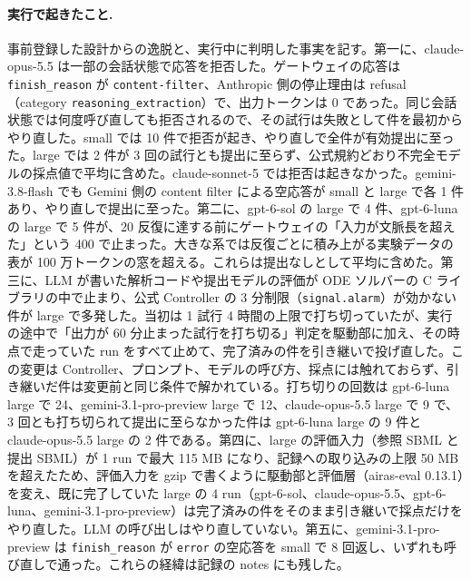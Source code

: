 \documentclass{article}
\providecommand{\unverified}[1]{#1}
\begin{document}


\paragraph{実行で起きたこと.}
事前登録した設計からの逸脱と、実行中に判明した事実を記す。第一に、claude-opus-5.5 は一部の会話状態で応答を拒否した。ゲートウェイの応答は \texttt{finish\_reason} が \texttt{content-filter}、Anthropic 側の停止理由は refusal（category \texttt{reasoning\_extraction}）で、出力トークンは 0 であった。同じ会話状態では何度呼び直しても拒否されるので、その試行は失敗として件を最初からやり直した。small では \unverified{10} 件で拒否が起き、やり直しで全件が有効提出に至った。large では \unverified{2} 件が 3 回の試行とも提出に至らず、公式規約どおり不完全モデルの採点値で平均に含めた。claude-sonnet-5 では拒否は起きなかった。gemini-3.8-flash でも Gemini 側の content filter による空応答が small と large で各 1 件あり、やり直しで提出に至った。第二に、gpt-6-sol の large で 4 件、gpt-6-luna の large で 5 件が、20 反復に達する前にゲートウェイの「入力が文脈長を超えた」という 400 で止まった。大きな系では反復ごとに積み上がる実験データの表が 100 万トークンの窓を超える。これらは提出なしとして平均に含めた。第三に、LLM が書いた解析コードや提出モデルの評価が ODE ソルバーの C ライブラリの中で止まり、公式 Controller の 3 分制限（\texttt{signal.alarm}）が効かない件が large で多発した。当初は 1 試行 4 時間の上限で打ち切っていたが、実行の途中で「出力が 60 分止まった試行を打ち切る」判定を駆動部に加え、その時点で走っていた run をすべて止めて、完了済みの件を引き継いで投げ直した。この変更は Controller、プロンプト、モデルの呼び方、採点には触れておらず、引き継いだ件は変更前と同じ条件で解かれている。打ち切りの回数は gpt-6-luna large で \unverified{24}、gemini-3.1-pro-preview large で \unverified{12}、claude-opus-5.5 large で \unverified{9} で、3 回とも打ち切られて提出に至らなかった件は gpt-6-luna large の \unverified{9} 件と claude-opus-5.5 large の \unverified{2} 件である。第四に、large の評価入力（参照 SBML と提出 SBML）が 1 run で最大 115 MB になり、記録への取り込みの上限 50 MB を超えたため、評価入力を gzip で書くように駆動部と評価層（airas-eval 0.13.1）を変え、既に完了していた large の 4 run（gpt-6-sol、claude-opus-5.5、gpt-6-luna、gemini-3.1-pro-preview）は完了済みの件をそのまま引き継いで採点だけをやり直した。LLM の呼び出しはやり直していない。第五に、gemini-3.1-pro-preview は \texttt{finish\_reason} が \texttt{error} の空応答を small で 8 回返し、いずれも呼び直しで通った。これらの経緯は記録の notes にも残した。
\end{document}
